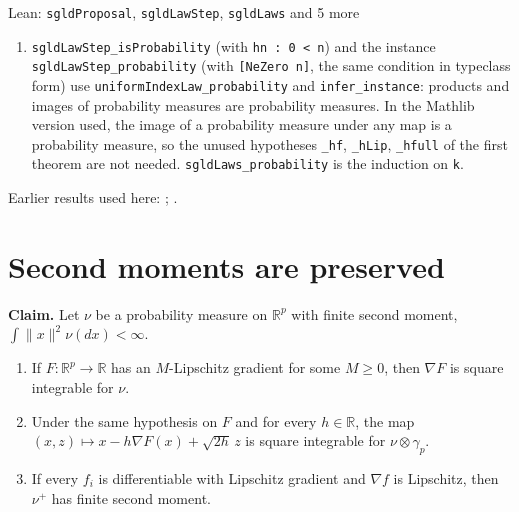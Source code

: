 \documentclass[11pt,a4paper]{article}
\begin{document}
\begin{leanbox}{Lean: \texttt{sgldProposal}, \texttt{sgldLawStep}, \texttt{sgldLaws} and 5 more}
\begin{enumerate}
\item \texttt{sgld\allowbreak{}Law\allowbreak{}Step\_\allowbreak{}is\allowbreak{}Probability} (with \texttt{hn : 0 < n}) and the instance \texttt{sgld\allowbreak{}Law\allowbreak{}Step\_\allowbreak{}probability} (with \texttt{[Ne\allowbreak{}Zero n]}, the same condition in typeclass form) use \texttt{uniform\allowbreak{}Index\allowbreak{}Law\_\allowbreak{}probability} and \texttt{infer\_\allowbreak{}instance}: products and images of probability measures are probability measures. In the Mathlib version used, the image of a probability measure under any map is a probability measure, so the unused hypotheses \texttt{\_\allowbreak{}hf}, \texttt{\_\allowbreak{}h\allowbreak{}Lip}, \texttt{\_\allowbreak{}hfull} of the first theorem are not needed. \texttt{sgld\allowbreak{}Laws\_\allowbreak{}probability} is the induction on \texttt{k}.

\end{enumerate}
\end{leanbox}


Earlier results used here: \cite[Section~3.34.1]{LangevinLean2026ULASC}; \cite[Section~3.36.5]{LangevinLean2026ULASC}.

\section{\texorpdfstring{Second moments are preserved}{Second moments are preserved}}


\textbf{Claim.} Let \(\nu\) be a probability measure on \(\mathbb R^p\) with finite second moment, \(\int\|x\|^2\nu(dx)<\infty\).



\begin{enumerate}


\item If \(F:\mathbb R^p\to\mathbb R\) has an \(M\)-Lipschitz gradient for some \(M\ge0\), then \(\nabla F\) is square integrable for \(\nu\).

\item Under the same hypothesis on \(F\) and for every \(h\in\mathbb R\), the map \((x,z)\mapsto x-h\nabla F(x)+\sqrt{2h}\,z\) is square integrable for \(\nu\otimes\gamma_p\).

\item If every \(f_i\) is differentiable with Lipschitz gradient and \(\nabla f\) is Lipschitz, then \(\nu^+\) has finite second moment.

\end{enumerate}
\end{document}
